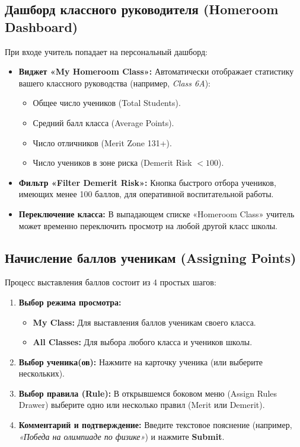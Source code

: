 \documentclass[12pt,a4paper]{article}
\begin{document}
\subsection{Дашборд классного руководителя (Homeroom Dashboard)}
При входе учитель попадает на персональный дашборд:
\begin{itemize}
    \item \textbf{Виджет «My Homeroom Class»:} Автоматически отображает статистику вашего классного руководства (например, \textit{Class 6A}):
    \begin{itemize}
        \item Общее число учеников (Total Students).
        \item Средний балл класса (Average Points).
        \item Число отличников (Merit Zone 131+).
        \item Число учеников в зоне риска (Demerit Risk $<100$).
    \end{itemize}
    \item \textbf{Фильтр «Filter Demerit Risk»:} Кнопка быстрого отбора учеников, имеющих менее 100 баллов, для оперативной воспитательной работы.
    \item \textbf{Переключение класса:} В выпадающем списке «Homeroom Class» учитель может временно переключить просмотр на любой другой класс школы.
\end{itemize}

\subsection{Начисление баллов ученикам (Assigning Points)}
Процесс выставления баллов состоит из 4 простых шагов:

\begin{enumerate}
    \item \textbf{Выбор режима просмотра:}
    \begin{itemize}
        \item \textbf{My Class:} Для выставления баллов ученикам своего класса.
        \item \textbf{All Classes:} Для выбора любого класса и учеников школы.
    \end{itemize}
    \item \textbf{Выбор ученика(ов):} Нажмите на карточку ученика (или выберите нескольких).
    \item \textbf{Выбор правила (Rule):} В открывшемся боковом меню (Assign Rules Drawer) выберите одно или несколько правил (Merit или Demerit).
    \item \textbf{Комментарий и подтверждение:} Введите текстовое пояснение (например, \textit{«Победа на олимпиаде по физике»}) и нажмите \textbf{Submit}.
\end{enumerate}
\end{document}
